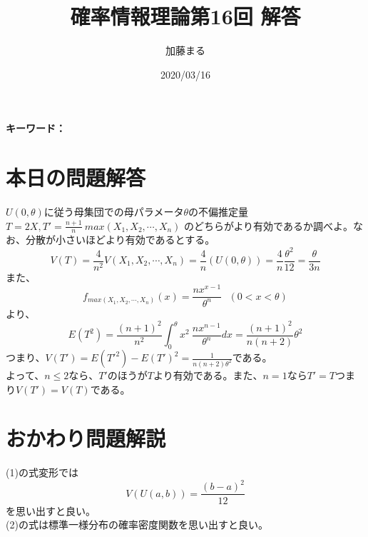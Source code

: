\documentclass[a4j,uplatex,dvipdfmx]{jsarticle}
\title{確率情報理論第16回 解答}
\author{加藤まる}
\date{2020/03/16}
\begin{document}
\maketitle
\bf キーワード：
\rm

\section*{本日の問題解答}
$U(0,\theta)$に従う母集団での母パラメータ$\theta$の不偏推定量$T=2X,T'=\frac{n+1}{n}~max(X_1,X_2,\cdots,X_n)$
のどちらがより有効であるか調べよ。なお、分散が小さいほどより有効であるとする。
\begin{equation}
  V(T)=\frac{4}{n^2}V(X_1,X_2,\cdots,X_n)=\frac{4}{n}(U(0,\theta))=\frac{4}{n}\frac{\theta^2}{12}=\frac{\theta}{3n}
\end{equation}
また、
\begin{equation}
  f_{max(X_1,X_2,\cdots,X_n)}(x)=\frac{nx^{x-1}}{\theta^n}~~~(0<x<\theta)
\end{equation}
より、
\begin{equation}
  E(T^2)=\frac{(n+1)^2}{n^2}\int_{0}^{\theta}x^2~\frac{nx^{n-1}}{\theta^n}dx = \frac{(n+1)^2}{n(n+2)}\theta^2
\end{equation}
つまり、$V(T')=E(T'^2)-E(T')^2=\frac{1}{n(n+2)\theta^2}$である。\\
よって、$n\le 2$なら、$T'$のほうが$T$より有効である。また、$n=1$なら$T'=T$つまり$V(T')=V(T)$である。

\section*{おかわり問題解説}
(1)の式変形では
\begin{equation}
  V(U(a,b))=\frac{(b-a)^2}{12}
\end{equation}
を思い出すと良い。\\
(2)の式は標準一様分布の確率密度関数を思い出すと良い。　
\end{document}
